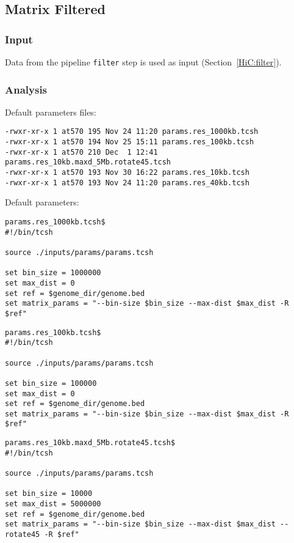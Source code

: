 \subsection{Matrix Filtered}\label{HiC:matrix-filtered} %
\subsubsection{Input} %
Data from the pipeline \texttt{filter} step is used as input (Section~\ref{HiC:filter}).
\subsubsection{Analysis} %
Default parameters files:

\begin{lstlisting}
-rwxr-xr-x 1 at570 195 Nov 24 11:20 params.res_1000kb.tcsh
-rwxr-xr-x 1 at570 194 Nov 25 15:11 params.res_100kb.tcsh
-rwxr-xr-x 1 at570 210 Dec  1 12:41 params.res_10kb.maxd_5Mb.rotate45.tcsh
-rwxr-xr-x 1 at570 193 Nov 30 16:22 params.res_10kb.tcsh
-rwxr-xr-x 1 at570 193 Nov 24 11:20 params.res_40kb.tcsh
\end{lstlisting}

Default parameters:

\begin{lstlisting}
params.res_1000kb.tcsh$
#!/bin/tcsh

source ./inputs/params/params.tcsh

set bin_size = 1000000
set max_dist = 0
set ref = $genome_dir/genome.bed
set matrix_params = "--bin-size $bin_size --max-dist $max_dist -R $ref"
\end{lstlisting}


\begin{lstlisting}
params.res_100kb.tcsh$
#!/bin/tcsh

source ./inputs/params/params.tcsh

set bin_size = 100000
set max_dist = 0
set ref = $genome_dir/genome.bed
set matrix_params = "--bin-size $bin_size --max-dist $max_dist -R $ref"
\end{lstlisting}


\begin{lstlisting}
params.res_10kb.maxd_5Mb.rotate45.tcsh$
#!/bin/tcsh

source ./inputs/params/params.tcsh

set bin_size = 10000
set max_dist = 5000000
set ref = $genome_dir/genome.bed
set matrix_params = "--bin-size $bin_size --max-dist $max_dist --rotate45 -R $ref"
\end{lstlisting}


